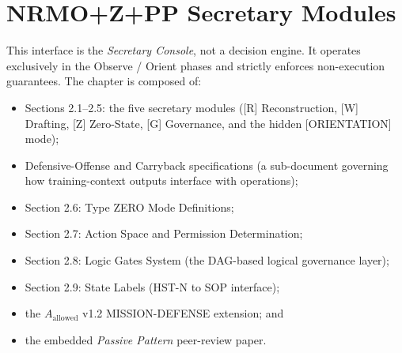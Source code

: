 
\chapter{NRMO+Z+PP Secretary Modules}
\label{ch:secretary-modules}


This interface is the \emph{Secretary Console}, not a decision
engine. It operates exclusively in the Observe / Orient phases and
strictly enforces non-execution guarantees. The chapter is composed
of:

\begin{itemize}
\item Sections 2.1--2.5: the five secretary modules
([R] Reconstruction, [W] Drafting, [Z] Zero-State, [G] Governance,
and the hidden [ORIENTATION] mode);
\item Defensive-Offense and Carryback specifications (a sub-document
governing how training-context outputs interface with operations);
\item Section 2.6: Type ZERO Mode Definitions;
\item Section 2.7: Action Space and Permission Determination;
\item Section 2.8: Logic Gates System (the DAG-based logical
governance layer);
\item Section 2.9: State Labels (HST-N to SOP interface);
\item the $A_{\mathrm{allowed}}$ v1.2 MISSION-DEFENSE extension; and
\item the embedded \emph{Passive Pattern} peer-review paper.
\end{itemize}










